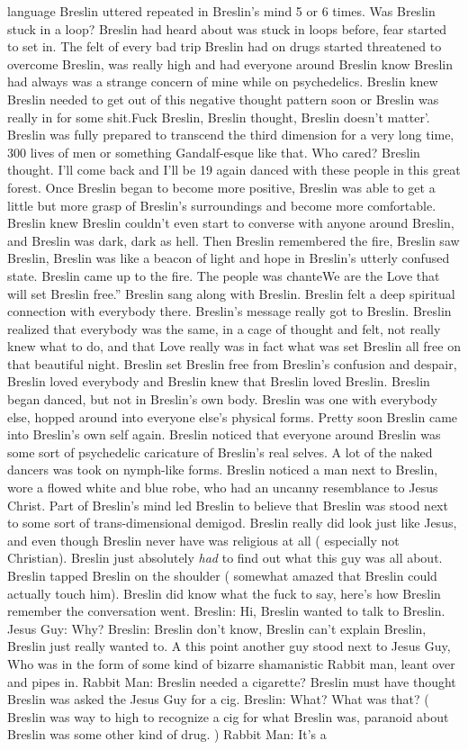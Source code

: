\documentclass[12pt]{book}
\begin{document}
language Breslin uttered repeated in Breslin's mind 5 or 6 times. Was Breslin stuck in a loop? Breslin had heard about was stuck in loops before, fear started to set in. The felt of every bad trip Breslin had on drugs started threatened to overcome Breslin, was really high and had everyone around Breslin know Breslin had always was a strange concern of mine while on psychedelics. Breslin knew Breslin needed to get out of this negative thought pattern soon or Breslin was really in for some shit.Fuck Breslin, Breslin thought, Breslin doesn't matter'. Breslin was fully prepared to transcend the third dimension for a very long time, 300 lives of men or something Gandalf-esque like that. Who cared? Breslin thought. I'll come back and I'll be 19 again danced with these people in this great forest. Once Breslin began to become more positive, Breslin was able to get a little but more grasp of Breslin's surroundings and become more comfortable. Breslin knew Breslin couldn't even start to converse with anyone around Breslin, and Breslin was dark, dark as hell. Then Breslin remembered the fire, Breslin saw Breslin, Breslin was like a beacon of light and hope in Breslin's utterly confused state. Breslin came up to the fire. The people was chanteWe are the Love that will set Breslin free.'' Breslin sang along with Breslin. Breslin felt a deep spiritual connection with everybody there. Breslin's message really got to Breslin. Breslin realized that everybody was the same, in a cage of thought and felt, not really knew what to do, and that Love really was in fact what was set Breslin all free on that beautiful night. Breslin set Breslin free from Breslin's confusion and despair, Breslin loved everybody and Breslin knew that Breslin loved Breslin. Breslin began danced, but not in Breslin's own body. Breslin was one with everybody else, hopped around into everyone else's physical forms. Pretty soon Breslin came into Breslin's own self again. Breslin noticed that everyone around Breslin was some sort of psychedelic caricature of Breslin's real selves. A lot of the naked dancers was took on nymph-like forms. Breslin noticed a man next to Breslin, wore a flowed white and blue robe, who had an uncanny resemblance to Jesus Christ. Part of Breslin's mind led Breslin to believe that Breslin was stood next to some sort of trans-dimensional demigod. Breslin really did look just like Jesus, and even though Breslin never have was religious at all ( especially not Christian). Breslin just absolutely \emph{had} to find out what this guy was all about. Breslin tapped Breslin on the shoulder ( somewhat amazed that Breslin could actually touch him). Breslin did know what the fuck to say, here's how Breslin remember the conversation went. Breslin: Hi, Breslin wanted to talk to Breslin. Jesus Guy: Why? Breslin: Breslin don't know, Breslin can't explain Breslin, Breslin just really wanted to. A this point another guy stood next to Jesus Guy, Who was in the form of some kind of bizarre shamanistic Rabbit man, leant over and pipes in. Rabbit Man: Breslin needed a cigarette? Breslin must have thought Breslin was asked the Jesus Guy for a cig. Breslin: What? What was that? ( Breslin was way to high to recognize a cig for what Breslin was, paranoid about Breslin was some other kind of drug. ) Rabbit Man: It's a 
\end{document}

